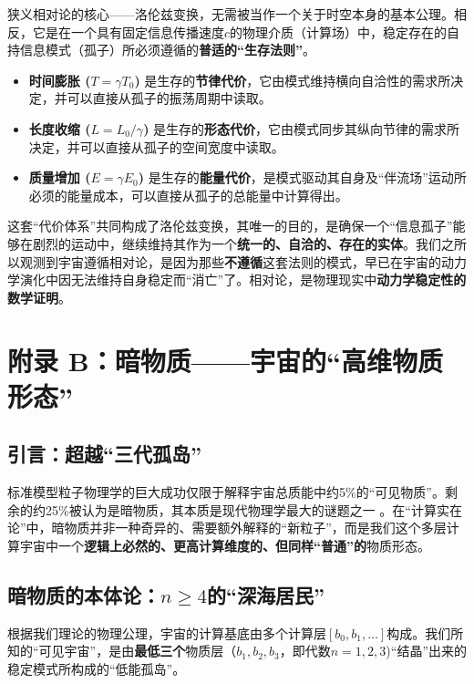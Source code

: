 \documentclass[11pt, a4paper]{article}
\begin{document}
狭义相对论的核心——洛伦兹变换，无需被当作一个关于时空本身的基本公理。相反，它是在一个具有固定信息传播速度$c$的物理介质（计算场）中，稳定存在的自持信息模式（孤子）所必须遵循的\textbf{普适的“生存法则”}。

\begin{itemize}
    \item \textbf{时间膨胀 ($T=\gamma T_0$)} 是生存的\textbf{节律代价}，它由模式维持横向自洽性的需求所决定，并可以直接从孤子的振荡周期中读取。
    \item \textbf{长度收缩 ($L=L_0/\gamma$)} 是生存的\textbf{形态代价}，它由模式同步其纵向节律的需求所决定，并可以直接从孤子的空间宽度中读取。
    \item \textbf{质量增加 ($E=\gamma E_0$)} 是生存的\textbf{能量代价}，是模式驱动其自身及“伴流场”运动所必须的能量成本，可以直接从孤子的总能量中计算得出。
\end{itemize}

这套“代价体系”共同构成了洛伦兹变换，其唯一的目的，是确保一个“信息孤子”能够在剧烈的运动中，继续维持其作为一个\textbf{统一的、自洽的、存在的实体}。我们之所以观测到宇宙遵循相对论，是因为那些\textbf{不遵循}这套法则的模式，早已在宇宙的动力学演化中因无法维持自身稳定而“消亡”了。相对论，是物理现实中\textbf{动力学稳定性的数学证明}。




\section{附录 B：暗物质——宇宙的“高维物质形态”}

\subsection{引言：超越“三代孤岛”}
标准模型粒子物理学的巨大成功仅限于解释宇宙总质能中约5\%的“可见物质”。剩余的约25\%被认为是暗物质，其本质是现代物理学最大的谜题之一 \cite{Planck2020}。在“计算实在论”中，暗物质并非一种奇异的、需要额外解释的“新粒子”，而是我们这个多层计算宇宙中一个\textbf{逻辑上必然的、更高计算维度的、但同样“普通”的}物质形态。

\subsection{暗物质的本体论：$n \ge 4$的“深海居民”}
根据我们理论的物理公理，宇宙的计算基底由多个计算层$[b_0, b_1, \dots]$构成。我们所知的“可见宇宙”，是由\textbf{最低三个}物质层（$b_1, b_2, b_3$，即代数$n=1, 2, 3$)“结晶”出来的稳定模式所构成的“低能孤岛”。
\end{document}
